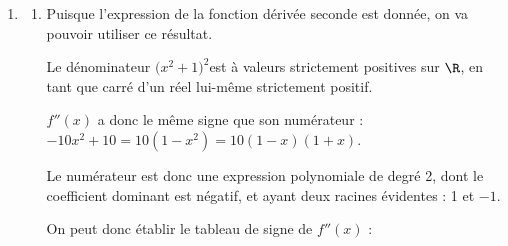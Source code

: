 \begin{enumerate}
\begin{enumerate}
Le signe de $f'(x)$ est donc celui du trinôme :\quad $-3x^2 + 10x - 3$.

Ce trinôme a un coefficient dominant égal à $-3$, donc négatif. Cela signifie que toutes les images \quad $-3x^2 + 10x - 3$ \quad sont négatives, sauf pour les valeurs $x$ comprises entre d'éventuelles racines.

Le discriminant du trinôme est :\quad $\Delta = 10^2 - 4\times (-3) \times (-3) = 100 - 36 = 64 = 8^2$.

Comme il est strictement positif, le trinôme admet deux racines réelles distinctes :

$x_1 = \dfrac{-10 - 8}{2\times (-3)} = 3$\quad et \quad  $x_2 = \dfrac{-10 + 8}{2\times (-3)} = \dfrac{1}{3}$.

On peut donc établir le tableau de signe suivant :

\hfill~\hfill~

On a donc une fonction $f$ qui est strictement décroissante sur l'intervalle $\left]-\infty ; \dfrac{1}{3}\right]$, ainsi que sur l'intervalle $[3 ; +\infty[$ et strictement croissante sur l'intervalle $\left[\dfrac{1}{3} ; 3\right] $.

Ceci est cohérent avec la courbe tracée sur le sujet.
		\end{enumerate}
\item 
	\begin{enumerate}
		\item Puisque l'expression de la fonction dérivée seconde est donnée, on va pouvoir utiliser ce résultat.

Le dénominateur \quad $\big(x^2 + 1\big)^2$\quad est à valeurs strictement positives sur $\R$, en tant que carré d'un réel lui-même strictement positif.

$f''(x)$ a donc le même signe que son numérateur :\quad $-10x^2 + 10 = 10(1 - x^2) = 10(1 - x)(1 + x)$.

Le numérateur est donc une expression polynomiale de degré 2, dont le coefficient dominant est négatif, et ayant deux racines évidentes : 1 et $-1$.

On peut donc établir le tableau de signe de $f''(x)$ :

\hfill~\hfill~


\end{enumerate}
\end{enumerate}
